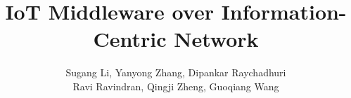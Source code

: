 \documentclass{sig-alternate-10pt}
\begin{document}
\title{IoT Middleware over Information-Centric Network}
\author{
\alignauthor 
Sugang Li, Yanyong Zhang, Dipankar Raychadhuri\\
Ravi Ravindran, Qingji Zheng, Guoqiang Wang\\
\\
\\
}
\maketitle





\balance
\scriptsize


\end{document}
